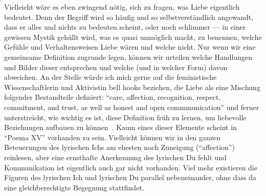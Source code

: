 Vielleicht wäre es eben zwingend nötig, sich zu fragen, was Liebe eigentlich bedeutet.
Denn der Begriff wird so häufig und so selbstverständlich angewandt, dass er alles und nichts zu bedeuten scheint, oder noch schlimmer — in einer gewissen Mystik gehüllt wird, was es quasi unmöglich macht, zu benennen, welche Gefühle und Verhaltensweisen Liebe wären und welche nicht.
Nur wenn wir eine gemeinsame Definition zugrunde legen, können wir urteilen welche Handlungen und Bilder dieser entsprechen und welche (und in welcher Form) davon abweichen.
An der Stelle würde ich mich gerne auf die feministische Wissenschaftlerin und Aktivistin bell hooks beziehen, die Liebe als eine Mischung folgender Bestandteile definiert: ``care, affection, recognition, respect, commitment, and trust, as well as honest and open commmunication''
und ferner unterstreicht, wie wichtig es ist, diese Definition früh zu lernen, um liebevolle Beziehungen aufbauen zu können~\cite{hooks2001}.
Kaum eines dieser Elemente scheint in ``Poema XV'' vorhanden zu sein.
Vielleicht können wir in den ganzen Beteuerungen des lyrischen Ichs am ehesten noch Zuneigung (``affection'') reinlesen, aber eine ernsthafte Anerkennung des lyrischen Du fehlt und Kommunikation ist eigentlich auch gar nicht vorhanden.
Viel mehr existieren die Figuren des lyrischen Ich und lyrischen Du parallel nebeneinander, ohne dass da eine gleichberechtigte Begegnung stattfindet.

